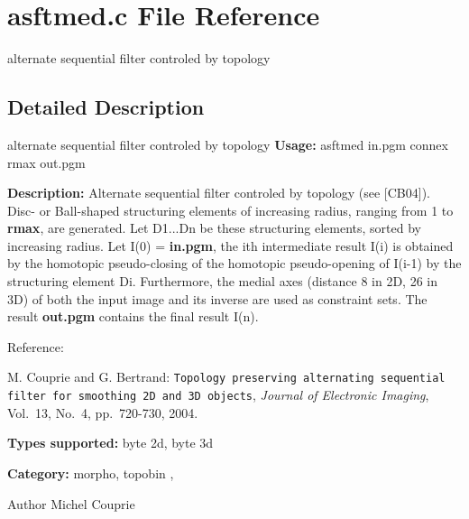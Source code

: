 \section{asftmed.c File Reference}
\label{asftmed_8c}


alternate sequential filter controled by topology  




\subsection{Detailed Description}
alternate sequential filter controled by topology {\bfseries Usage:} asftmed in.pgm connex rmax out.pgm

{\bfseries Description:} Alternate sequential filter controled by topology (see [CB04]). Disc-\/ or Ball-\/shaped structuring elements of increasing radius, ranging from 1 to {\bfseries rmax}, are generated. Let D1...Dn be these structuring elements, sorted by increasing radius. Let I(0) = {\bfseries in.pgm}, the ith intermediate result I(i) is obtained by the homotopic pseudo-\/closing of the homotopic pseudo-\/opening of I(i-\/1) by the structuring element Di. Furthermore, the medial axes (distance 8 in 2D, 26 in 3D) of both the input image and its inverse are used as constraint sets. The result {\bfseries out.pgm} contains the final result I(n).

Reference:\par
 [CB04] M. Couprie and G. Bertrand: {\tt Topology preserving alternating sequential filter for smoothing 2D and 3D objects}, {\itshape  Journal of Electronic Imaging\/}, Vol.~13, No.~4, pp.~720-\/730, 2004.

{\bfseries Types supported:} byte 2d, byte 3d

{\bfseries Category:} morpho, topobin ,

\begin{DoxyAuthor}{Author}
Michel Couprie 
\end{DoxyAuthor}
